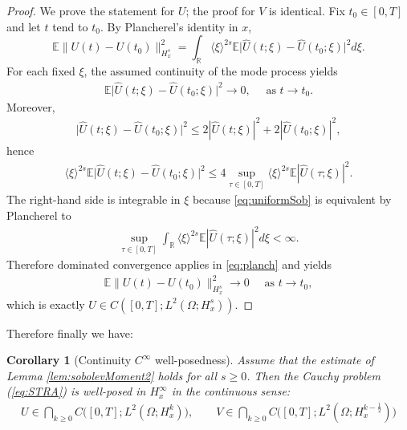 \documentclass{article}
\makeatletter
\newcommand{\ang}[1]{\langle #1\rangle}
\def\R{\mathbb{R}}
\def\E{\mathbb{E}}
\newtheorem{corollary}[theorem]{Corollary}
\def\section{\@startsection {section}{1}{\z@}{3.25ex plus 1ex minus
		.2ex}{1.5ex plus .2ex}{\large\bf}}
\makeatother
\begin{document}
\begin{proof}
We prove the statement for $U$; the proof for $V$ is identical. Fix $t_0\in[0,T]$ and let $t$ tend to $t_0$. By Plancherel's identity in $x$,
\begin{equation}\label{eq:planch}
\E\|U(t)-U(t_0)\|_{H_x^s}^2
=
\int_{\R}\ang{\xi}^{2s}\E\big|\widehat U(t;\xi)-\widehat U(t_0;\xi)\big|^2d\xi.
\end{equation}
For each fixed $\xi$, the assumed continuity of the mode process yields
\begin{align*}
\E\big|\widehat U(t;\xi)-\widehat U(t_0;\xi)\big|^2\longrightarrow 0,
\quad\mbox{ as } t\to t_0.
\end{align*}
Moreover,
\begin{align*}
\big|\widehat U(t;\xi)-\widehat U(t_0;\xi)\big|^2
\le 2|\widehat U(t;\xi)|^2+2|\widehat U(t_0;\xi)|^2,
\end{align*}
hence
\begin{align*}
\ang{\xi}^{2s}\E\big|\widehat U(t;\xi)-\widehat U(t_0;\xi)\big|^2
\le
4\sup_{\tau\in[0,T]}\ang{\xi}^{2s}\E|\widehat U(\tau;\xi)|^2.
\end{align*}
The right-hand side is integrable in $\xi$ because \eqref{eq:uniformSob} is
equivalent by Plancherel to
\begin{align*}
\sup_{\tau\in[0,T]}\int_{\R}\ang{\xi}^{2s}\E|\widehat U(\tau;\xi)|^2d\xi<\infty.
\end{align*}
Therefore dominated convergence applies in \eqref{eq:planch} and yields
\begin{align*}
	\E\|U(t)-U(t_0)\|_{H_x^s}^2\longrightarrow 0
\quad\mbox{ as } t\to t_0,
\end{align*}
which is exactly $U\in C([0,T];L^2(\Omega;H_x^s))$.
\end{proof}

Therefore finally we have:

\begin{corollary}[Continuity $C^\infty$ well-posedness]\label{finRes}
Assume that the estimate of Lemma \ref{lem:sobolevMoment2} holds for all $s\ge0$.
Then the Cauchy problem (\ref{eq:STRA}) is well-posed in $H_x^\infty$ in the continuous 
sense:
\begin{align*}
U\in \bigcap_{k\ge0}C\big([0,T];L^2(\Omega;H_x^k)\big) ,
\qquad
V\in \bigcap_{k\ge0} C\big([0,T];L^2(\Omega;H_x^{k-\frac12})\big)
\end{align*}
\end{corollary}

\end{document}
